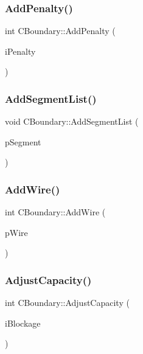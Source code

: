 \subsubsection{\texorpdfstring{AddPenalty()}{AddPenalty()}}
{\footnotesize\ttfamily int C\+Boundary\+::\+Add\+Penalty (\begin{DoxyParamCaption}\item[{int}]{i\+Penalty }\end{DoxyParamCaption})}

\mbox{\label{classCBoundary_a180a2319791010fa59e9a09ffdd2accc}} 
\subsubsection{\texorpdfstring{AddSegmentList()}{AddSegmentList()}}
{\footnotesize\ttfamily void C\+Boundary\+::\+Add\+Segment\+List (\begin{DoxyParamCaption}\item[{vector$<$ \mbox{\hyperlink{classCSegment}{C\+Segment}} $\ast$ $>$ $\ast$}]{p\+Segment }\end{DoxyParamCaption})}

\mbox{\label{classCBoundary_a8cd3af613c5651eb65fe697dafc36381}} 
\subsubsection{\texorpdfstring{AddWire()}{AddWire()}}
{\footnotesize\ttfamily int C\+Boundary\+::\+Add\+Wire (\begin{DoxyParamCaption}\item[{\mbox{\hyperlink{classCWire}{C\+Wire}} $\ast$}]{p\+Wire }\end{DoxyParamCaption})}

\mbox{\label{classCBoundary_a81895020861c7628a3a3a684a558960a}} 
\subsubsection{\texorpdfstring{AdjustCapacity()}{AdjustCapacity()}}
{\footnotesize\ttfamily int C\+Boundary\+::\+Adjust\+Capacity (\begin{DoxyParamCaption}\item[{int}]{i\+Blockage }\end{DoxyParamCaption})}

